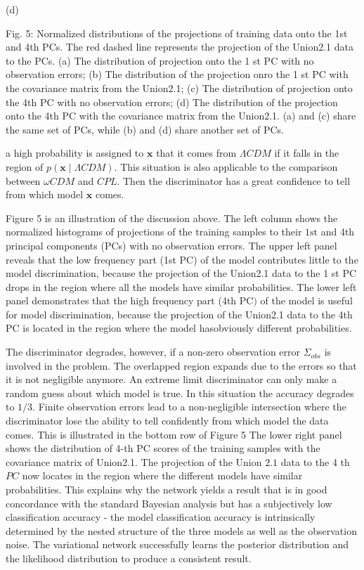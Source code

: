 \documentclass[10pt]{article}
\begin{document}
(d)

Fig. 5: Normalized distributions of the projections of training data onto the 1st and 4th PCs. The red dashed line represents the projection of the Union2.1 data to the PCs. (a) The distribution of projection onto the 1 st PC with no observation errors; (b) The distribution of the projection onro the 1 st $\mathrm{PC}$ with the covariance matrix from the Union2.1; (c) The distribution of projection onto the 4th PC with no observation errors; (d) The distribution of the projection onto the 4th PC with the covariance matrix from the Union2.1. (a) and (c) share the same set of PCs, while (b) and (d) share another set of PCs.

a high probability is assigned to $\boldsymbol{x}$ that it comes from $\Lambda C D M$ if it falls in the region of $p(\boldsymbol{x} \mid \Lambda C D M)$. This situation is also applicable to the comparison between $\omega C D M$ and $C P L$. Then the discriminator has a great confidence to tell from which model $\boldsymbol{x}$ comes.

Figure 5 is an illustration of the discussion above. The left column shows the normalized histograms of projections of the training samples to their $1 \mathrm{st}$ and 4th principal components (PCs) with no observation errors. The upper left panel reveals that the low frequency part (1st PC) of the model contributes little to the model discrimination, because the projection of the Union2.1 data to the 1 st PC drops in the region where all the models have similar probabilities. The lower left panel demonstrates that the high frequency part (4th $\mathrm{PC})$ of the model is useful for model discrimination, because the projection of the Union2.1 data to the 4th $\mathrm{PC}$ is located in the region where the model hasobviously different probabilities.

The discriminator degrades, however, if a non-zero observation error $\Sigma_{o b s}$ is involved in the problem. The overlapped region expands due to the errors so that it is not negligible anymore. An extreme limit discriminator can only make a random guess about which model is true. In this situation the accuracy degrades to $1 / 3$. Finite observation errors lead to a non-negligible intersection where the discriminator lose the ability to tell confidently from which model the data comes. This is illustrated in the bottom row of Figure 5 The lower right panel shows the distribution of 4-th PC scores of the training samples with the covariance matrix of Union2.1. The projection of the Union $2.1$ data to the 4 th $P C$ now locates in the region where the different models have similar probabilities. This explains why the network yields a result that is in good concordance with the standard Bayesian analysis but has a subjectively low classification accuracy - the model classification accuracy is intrinsically determined by the nested structure of the three models as well as the observation noise. The variational network successfully learns the posterior distribution and the likelihood distribution to produce a consistent result.
\end{document}
